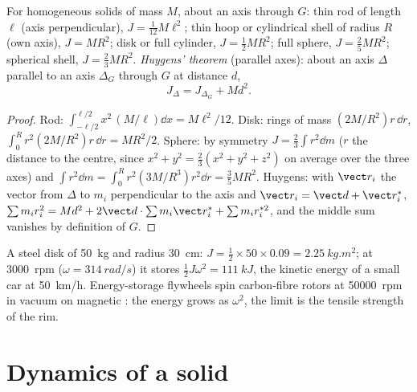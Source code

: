 \begin{proposition}\label{prop:b2:rigid-body-mechanics:inertia}
For homogeneous solids of mass $M$, about an axis through $G$: thin rod
of length $\ell$ (axis perpendicular), $J = \tfrac1{12}M\ell^2$; thin hoop
or cylindrical shell of radius $R$ (own axis), $J = MR^2$; disk or full
cylinder, $J = \tfrac12MR^2$; full sphere, $J = \tfrac25MR^2$; spherical
shell, $J = \tfrac23MR^2$. \emph{Huygens' theorem} (parallel axes): about
an axis $\Delta$ parallel to an axis $\Delta_G$ through $G$ at distance
$d$,
\[
J_\Delta = J_{\Delta_G} + Md^2 .
\]
\end{proposition}

\begin{proof}
Rod: $\int_{-\ell/2}^{\ell/2}x^2\,(M/\ell)\dd x = M\ell^2/12$. Disk: rings of
mass $(2M/R^2)r\,\dd r$, $\int_0^R r^2(2M/R^2)r\,\dd r = MR^2/2$. Sphere: by
symmetry $J = \tfrac23\int r^2\dd m$ ($r$ the distance to the centre,
since $x^2 + y^2 = \tfrac23(x^2 + y^2 + z^2)$ on average over the three
axes) and $\int r^2\dd m = \int_0^R r^2(3M/R^3)r^2\dd r = \tfrac35MR^2$.
Huygens: with $\vect r_i$ the vector from $\Delta$ to $m_i$ perpendicular
to the axis and $\vect r_i = \vect d + \vect r_i^*$, $\sum m_ir_i^2 = Md^2
+ 2\vect d\cdot\sum m_i\vect r_i^* + \sum m_ir_i^{*2}$, and the middle sum
vanishes by definition of $G$.
\end{proof}

\begin{example}[A flywheel]\label{ex:b2:rigid-body-mechanics:flywheel}
A steel disk of \qty{50}{kg} and radius \qty{30}{cm}: $J = \tfrac12 \times
50 \times 0.09 = \qty{2.25}{kg.m^2}$; at \qty{3000}{rpm} ($\omega =
\qty{314}{rad/s}$) it stores $\tfrac12J\omega^2 = \qty{111}{kJ}$, the
kinetic energy of a small car at \qty{50}{km/h}. Energy-storage flywheels
spin carbon-fibre rotors at \qty{50000}{rpm} in vacuum on magnetic
: the energy grows as $\omega^2$, the limit is the tensile
strength of the rim.
\end{example}

\section{Dynamics of a solid}

